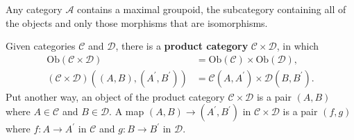 \documentclass[12pt, oneside]{book}
\begin{document}
\begin{proposition}
    Any category $\mathcal  {A}$ contains a maximal groupoid, the subcategory containing
    all of the objects and only those morphisms that are isomorphisms.
\end{proposition}



\begin{definition}
    Given categories $\mathcal{C}$ and $\mathcal{D}$, there is a \textbf{product category} $\mathcal{C} \times \mathcal{D}$, in which
    \begin{equation*}
        \begin{aligned}
            \mathrm{Ob}(\mathcal{C} \times \mathcal{D})                                             & =\mathrm{Ob}(\mathcal{C}) \times \mathrm{Ob}(\mathcal{D}),                            \\
            (\mathcal{C} \times \mathcal{D})\left((A, B),\left(A^{\prime}, B^{\prime}\right)\right) & =\mathcal{C}\left(A, A^{\prime}\right) \times \mathcal{D}\left(B, B^{\prime}\right) .
        \end{aligned}
    \end{equation*}
    Put another way, an object of the product category $\mathcal{C} \times \mathcal{D}$ is a pair $\left(A, B\right)$ where $A \in \mathcal{C}$ and $B \in \mathcal{D}$. A map $(A, B) \rightarrow\left(A^{\prime}, B^{\prime}\right)$ in $\mathcal{C} \times \mathcal{D}$ is a pair $(f, g)$ where $f: A \rightarrow A^{\prime}$ in $\mathcal{C}$ and $g: B \rightarrow B^{\prime}$ in $\mathcal{D}$.
\end{definition}
\end{document}
